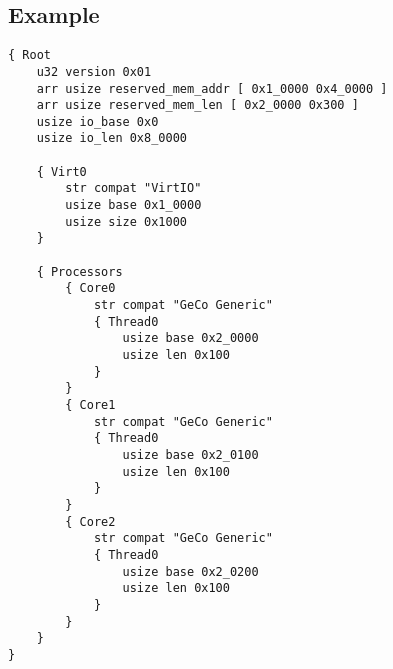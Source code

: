 \documentclass{article}
\begin{document}
\pagebreak
\subsection{Example}
\begin{lstlisting}[style=Generic]
{ Root
    u32 version 0x01
    arr usize reserved_mem_addr [ 0x1_0000 0x4_0000 ]
    arr usize reserved_mem_len [ 0x2_0000 0x300 ]
    usize io_base 0x0
    usize io_len 0x8_0000

    { Virt0
        str compat "VirtIO"
        usize base 0x1_0000  
        usize size 0x1000
    }

    { Processors
        { Core0
            str compat "GeCo Generic"
            { Thread0
                usize base 0x2_0000
                usize len 0x100
            }
        }
        { Core1
            str compat "GeCo Generic"
            { Thread0
                usize base 0x2_0100
                usize len 0x100
            }
        }
        { Core2
            str compat "GeCo Generic"
            { Thread0
                usize base 0x2_0200
                usize len 0x100
            }
        }
    }
}
\end{lstlisting}
\end{document}
